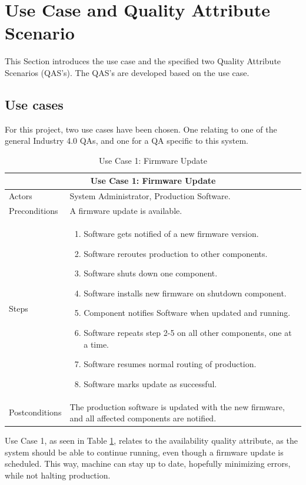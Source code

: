 \section{Use Case and Quality Attribute Scenario}
\label{sec:use_case_and_qas}
This Section introduces the use case and the specified two Quality Attribute Scenarios (QAS's).
The QAS's are developed based on the use case.

\subsection{Use cases}
\label{sec:use_case}
For this project, two use cases have been chosen. One relating to one of the general Industry 4.0 QAs, and one for a QA specific to this system.

\begin{table}[ht]
    \centering
    \begin{tabular}{|l|p{50mm}|}
        \hline
        \multicolumn{2}{|c|}{\textbf{Use Case 1: Firmware Update}}\\
        \hline
        Actors &  System Administrator, Production Software.\\
        \hline
        Preconditions &  A firmware update is available.\\
        \hline
        Steps & \begin{enumerate}
                    \item Software gets notified of a new firmware version.
                    \item Software reroutes production to other components.
                    \item Software shuts down one  component.
                    \item Software installs new firmware on shutdown component.
                    \item Component notifies Software when updated and running.
                    \item Software repeats step 2-5 on all other components, one at a time.
                    \item Software resumes normal routing of production.
                    \item Software marks update as successful.
                \end{enumerate}\\
        \hline
        Postconditions & The production software is updated with the new firmware, and all affected components are notified.\\
        \hline
    \end{tabular}
    \caption{Use Case 1: Firmware Update}
    \label{tab:useCase1}
\end{table}
Use Case 1, as seen in Table \ref{tab:useCase1}, relates to the availability quality attribute, as the system should be able to continue running, even though a firmware update is scheduled. This way, machine can stay up to date, hopefully minimizing errors, while not halting production.

